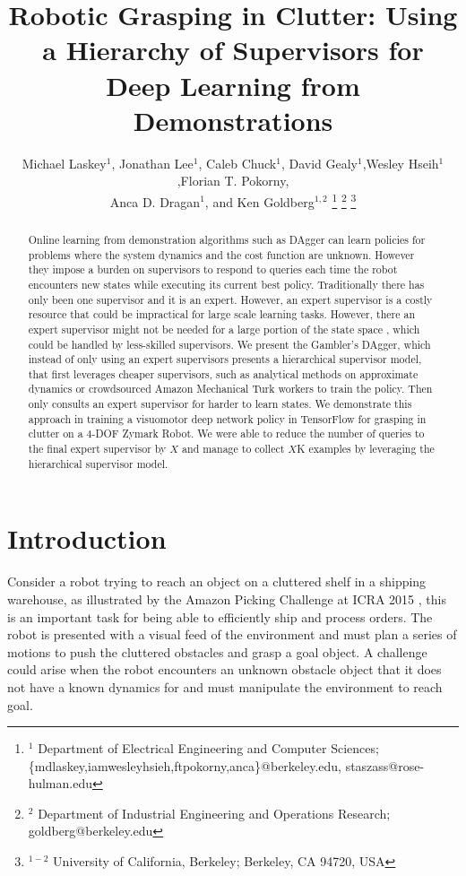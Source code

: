 \documentclass[10pt, conference]{ieeeconf}      %
\title{Robotic Grasping in Clutter: Using a Hierarchy of Supervisors for Deep Learning from Demonstrations}
\author{Michael Laskey$^1$, Jonathan Lee$^1$, Caleb Chuck$^1$, David Gealy$^1$,Wesley Hseih$^1$,Florian T. Pokorny,\\
 Anca D. Dragan$^1$, and Ken Goldberg$^{1,2}$%
\thanks{$^1$ Department of Electrical Engineering and Computer Sciences; {\small \{mdlaskey,iamwesleyhsieh,ftpokorny,anca\}@berkeley.edu, \small staszass@rose-hulman.edu} }%
\thanks{$^2$ Department of Industrial Engineering and Operations Research; {\small goldberg@berkeley.edu}}%
\thanks{$^{1-2}$ University of California, Berkeley;  Berkeley, CA 94720, USA}%
}
\begin{document}
\maketitle
\thispagestyle{empty}
\pagestyle{empty}



\begin{abstract}
Online learning from demonstration algorithms such as
DAgger can learn policies for problems where the system dynamics and
the cost function are unknown. However they impose a
burden on supervisors to respond to queries each time the robot
encounters new states while executing its current best policy.  Traditionally there has only been one supervisor and it is an expert. However, an expert supervisor is a costly resource that could be impractical for large scale learning tasks. However, there an expert supervisor might not be needed for a large portion of the state space , which could be handled by less-skilled supervisors. We present the Gambler's DAgger, which instead of only using an expert supervisors presents a hierarchical supervisor model, that first leverages cheaper supervisors, such as analytical methods on approximate dynamics or crowdsourced Amazon Mechanical Turk workers to train the policy. Then only consults an expert supervisor for harder to learn states. We demonstrate this approach in training a visuomotor deep network policy in TensorFlow for grasping in clutter on a 4-DOF Zymark Robot. We were able to reduce the number of queries to the final expert supervisor by $X$ and manage to collect $X$K examples by leveraging the hierarchical supervisor model. 
 \end{abstract}



\section{Introduction} 
Consider a robot trying to reach an object on a cluttered shelf in a shipping warehouse, as illustrated by the Amazon Picking Challenge at ICRA 2015 \cite{mahler2016dexnet}, this is an important task for being able to efficiently ship and process orders.   The robot is presented with a visual feed of the environment and must plan a series of motions to push the cluttered obstacles and grasp a goal object. A challenge could arise  when the robot encounters an unknown obstacle object that it does not have a known dynamics  for and must manipulate the environment to reach goal. 
\end{document}
